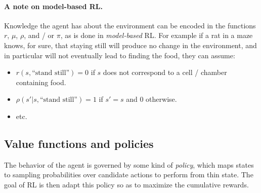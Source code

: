 \documentclass{article} %
\begin{document}
\paragraph{A note on model-based RL.}
Knowledge the agent has about the environment can be encoded in the
functions $r$, $\mu$, $\rho$, and / or $\pi$, as is done in
\textit{model-based} RL. For example if a rat in a maze knows, for sure,
that staying still will produce no change in the environment, and in particular will not eventually lead to finding the food, they can assume:
\begin{itemize}
\item $r(s, \text{``stand still''}) = 0$ if $s$ does not correspond to a cell / chamber containing food.
\item $\rho(s'|s,\text{``stand still''}) = 1$ if $s'=s$ and $0$ otherwise.
\item etc.
\end{itemize}

\subsection{Value functions and policies}
The behavior of the agent is governed by some kind of \textit{policy}, which maps states to
sampling probabilities over candidate actions to perform from thin state. The  goal of RL is then
adapt this policy so as to  maximize the cumulative rewards.
\end{document}
